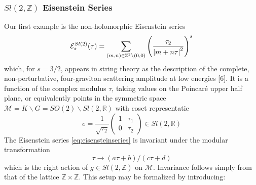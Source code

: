 \subsubsection{$Sl(2,\mathbb{Z})$ Eisenstein Series}
Our first example is the non-holomorphic Eisenstein series
\begin{equation}
  \mathcal{E}^{Sl(2)}_s(\tau) = \sum_{(m,n)\in\mathbb{Z}^2\backslash
  (0,0)}\left(\frac{\tau_2}{\abs{m+n\tau}^2}\right)^s
  \label{eq:eisensteinseries}
\end{equation}
which, for $s=3/2$, appears in string theory as the description of the
complete, non-perturbative, four-graviton scattering amplitude at low energies
[6]. It is a  function of the complex modulus $\tau$, taking values on the
Poincar\'e upper half plane, or equivalently points in the symmetric space
$\mathcal{M} = K\backslash G=SO(2)\backslash Sl(2,\mathbb{R})$ with coset representatie
\begin{equation}
  e = \frac{1}{\sqrt{\tau_2}}
  \begin{pmatrix}
    1 & \tau_1\\
    0 & \tau_2
  \end{pmatrix}
  \label{eq:linearrepresentation}
  \in Sl(2,\mathbb{R})
\end{equation}
The Eisenstein series \eqref{eq:eisensteinseries} is invariant under the
modular transformation
\begin{equation}
  \tau \rightarrow (a\tau + b)/(c\tau + d)
\end{equation}
which is the right action of $g\in Sl(2,\mathbb{Z})$ on $\mathcal{M}$.
Invariance follows simply from that of the lattice
$\mathbb{Z}\times\mathbb{Z}$. This setup may be formalized by introducing:

